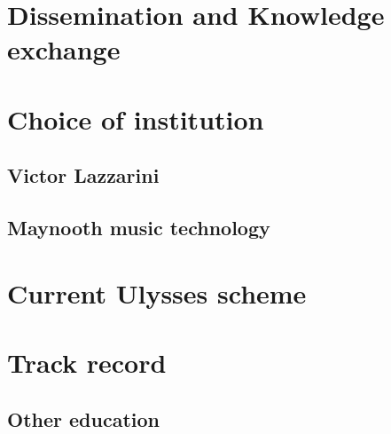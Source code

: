 \documentclass[journal,onecolumn]{IEEEtran}
\begin{document}
\section{Dissemination and Knowledge exchange} %

\section{Choice of institution} %
\subsection{Victor Lazzarini}
\subsection{Maynooth music technology}

\section{Current Ulysses scheme} %

\section{Track record}
\subsection{Other education} %
\end{document}
